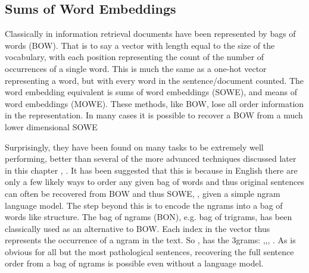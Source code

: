 \documentclass[12pt,parskip]{komatufte}
\begin{document}
\subsection{Sums of Word Embeddings}

Classically in information retrieval documents have been represented by bags of words (BOW).
That is to say a vector with length equal to the size of the vocabulary, with each position representing the count of the number of occurrences of a single word.
This is much the same as a one-hot vector representing a word, but with every word in the sentence/document counted.
The word embedding equivalent is sums of word embeddings (SOWE), and means of word embeddings (MOWE).
These methods, like BOW, lose all order information in the representation.
In many cases it is possible to recover a BOW from a much lower dimensional SOWE 

Surprisingly, they have been found on many tasks to be extremely well performing, better than several of the more advanced techniques discussed later in this chapter  , .
It has been suggested that this is because in English there are only a few likely ways to order any given bag of words and thus original sentences can often be recovered from BOW  and thus SOWE, , given a simple ngram language model.
The step beyond this is to encode the ngrams into a bag of words like structure.
The bag of ngrams (BON), e.g. bag of trigrams, has been classically used as an alternative to BOW.
Each index in the vector thus represents the occurrence of a ngram in the text.
So , has the 3grams: ,,, .
As is obvious for all but the most pathological sentences, recovering the full sentence order from a bag of ngrams is possible even without a language model.
\end{document}
